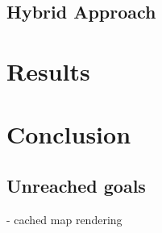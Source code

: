\documentclass{article}
\begin{document}
\subsection{Hybrid Approach}

\section{Results}

\section{Conclusion}
\subsection{Unreached goals}
- cached map rendering
\end{document}
